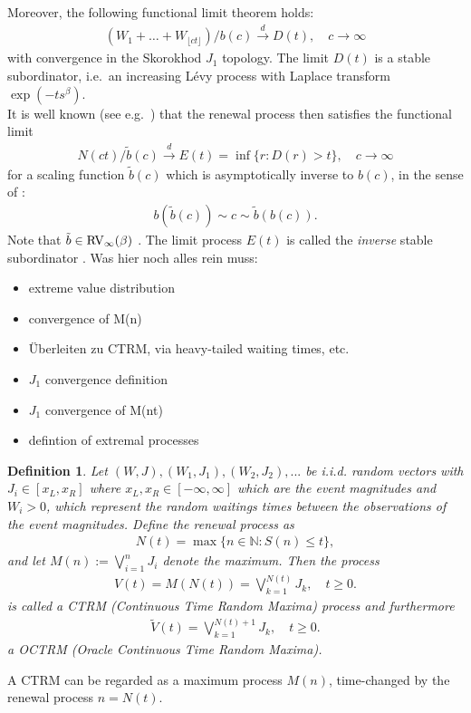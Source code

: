 \documentclass[12pt]{article}
\newtheorem{definition}[equation]{Definition}
\newcommand{\1}{\mathbf 1}
\newcommand{\Floor}[1]{{\lfloor {#1} \rfloor}}
\newcommand{\cd}{\overset{d}{\longrightarrow}}
\begin{document}
Moreover, the following functional limit theorem holds:
\begin{align}
(W_1 + \ldots + W_{\Floor{ct}})/b(c) \overset{d}{\longrightarrow} D(t), 
\quad c \to \infty
\end{align}
with convergence in the Skorokhod $J_1$ topology.
The limit $D(t)$ is a stable subordinator, i.e.\ an increasing
L\'evy process with Laplace transform $\exp(-t s^\beta)$.\\ 
It is well known (see e.g.\ \cite{limitCTRW}) that the renewal
process then satisfies the functional limit
\begin{align}
N(ct)/\tilde b(c) \cd E(t) = \inf\{r: D(r) > t\}, 
\quad c \to \infty
\end{align}
for a scaling function $\tilde b(c)$ which is 
asymptotically inverse to $b(c)$, in the sense
of \cite[p.20]{seneta}: 
\begin{align}\label{eq:tildeb}
b(\tilde b(c)) \sim c \sim \tilde b(b(c)).
\end{align}
Note that $\tilde b \in {\rm RV}_\infty(\beta)$ 
\cite{limitCTRW}.
The limit process $E(t)$ is called the \emph{inverse} stable
subordinator \cite{invSubord}.
Was hier noch alles rein muss:
\begin{itemize} 
\item extreme value distribution
\item convergence of M(n)
\item Überleiten zu CTRM, via heavy-tailed waiting times, etc.
\item $J_1$ convergence definition
\item $J_1$ convergence of M(nt)
\item defintion of extremal processes 
\end{itemize}
\begin{definition}
Let $(W,J),(W_1,J_1),(W_2,J_2),...$ be i.i.d. random vectors with $J_i \in [x_L, x_R]$ where $x_L, x_R \in [-\infty, \infty]$ which are the event magnitudes and $W_i > 0$, which represent the random waitings times between the observations of the event magnitudes. Define the renewal process as
\begin{align} \label{eq:renewal-process}
N(t) = \max\{n \in \mathbb N: S(n) \le t\},
\end{align}
and let $M(n) := \bigvee_{i=1}^n J_i$ denote the maximum. Then the process
\begin{align}
V(t)=M(N(t)) = \bigvee_{k=1}^{N(t)} J_k, \quad t \ge 0.
\end{align}
is called a CTRM (Continuous Time Random Maxima) process and furthermore
\begin{align}
\tilde V(t) = \bigvee_{k=1}^{N(t)+1} J_k, \quad t \ge 0.
\end{align}
a OCTRM (Oracle Continuous Time Random Maxima).
\end{definition}
A CTRM can be regarded as a maximum process $M(n)$, time-changed by the
renewal process $n = N(t)$. 
\end{document}
